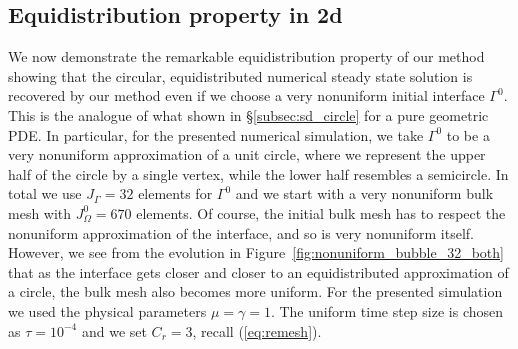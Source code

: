 \subsection{Equidistribution property in 2d}
We now demonstrate the remarkable equidistribution property of our method
showing that the circular, equidistributed numerical steady state solution is
recovered by our method even if we choose a very nonuniform initial interface
$\Gamma^0$. This is the analogue of what shown in \S\ref{subsec:sd_circle}
for a pure geometric PDE. In particular, for the presented numerical
simulation, we take $\Gamma^0$ to be a very nonuniform approximation of a unit
circle, where we represent the upper half of the circle by a single vertex,
while the lower half resembles a semicircle. In total we use $J_\Gamma = 32$
elements for $\Gamma^0$ and we start with a very nonuniform bulk mesh with
$J_\Omega^0 = 670$ elements. Of course, the initial bulk mesh has to respect
the nonuniform approximation of the interface, and so is very nonuniform
itself. However, we see from the evolution in
Figure~\ref{fig:nonuniform_bubble_32_both} that as the interface gets closer
and closer to an equidistributed approximation of a circle, the bulk mesh also
becomes more uniform. For the presented simulation we used the physical
parameters $\mu= \gamma=1$. The uniform time step size is chosen as
$\tau=10^{-4}$ and we set $C_r=3$, recall (\ref{eq:remesh}).
